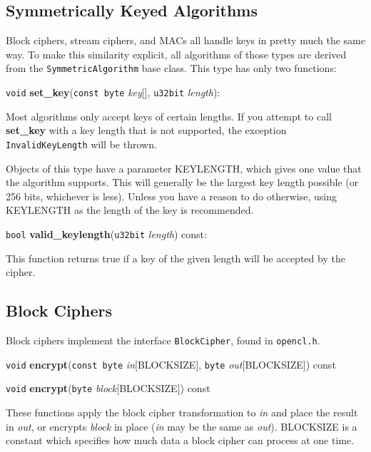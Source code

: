 \documentclass{article}
\newcommand{\filename}[1]{\texttt{#1}}
\newcommand{\function}[1]{\textbf{#1}}
\newcommand{\type}[1]{\texttt{#1}}
\renewcommand{\arg}[1]{\textsl{#1}}
\begin{document}
\subsection{Symmetrically Keyed Algorithms}

Block ciphers, stream ciphers, and MACs all handle keys in pretty much the same
way. To make this similarity explicit, all algorithms of those types are
derived from the \type{SymmetricAlgorithm} base class. This type has only two
functions:

\vskip 10pt \noindent
\type{void} \function{set\_key}(\type{const byte} \arg{key}[], \type{u32bit}
\arg{length}):

\vskip 5pt

Most algorithms only accept keys of certain lengths. If you attempt to call
\function{set\_key} with a key length that is not supported, the exception
\type{InvalidKeyLength} will be thrown.

Objects of this type have a parameter KEYLENGTH, which gives one value that the
algorithm supports. This will generally be the largest key length possible (or
256 bits, whichever is less). Unless you have a reason to do otherwise, using
KEYLENGTH as the length of the key is recommended.

\vskip 10pt \noindent
\type{bool} \function{valid\_keylength}(\type{u32bit} \arg{length}) const:

\vskip 5pt

This function returns true if a key of the given length will be accepted by
the cipher.

\subsection{Block Ciphers}

Block ciphers implement the interface \type{BlockCipher}, found in
\filename{opencl.h}.

\vskip 10pt \noindent
\type{void} \function{encrypt}(\type{const byte} \arg{in}[BLOCKSIZE],
                               \type{byte} \arg{out}[BLOCKSIZE]) const

\noindent
\type{void} \function{encrypt}(\type{byte} \arg{block}[BLOCKSIZE]) const

\vskip 5pt

These functions apply the block cipher transformation to \arg{in} and place the
result in \arg{out}, or encrypts \arg{block} in place (\arg{in} may be the same
as \arg{out}). BLOCKSIZE is a constant which specifies how much data a block
cipher can process at one time.
\end{document}
